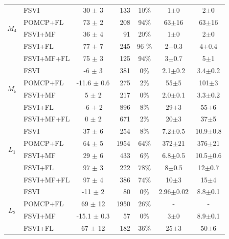 \documentclass[letterpaper]{article} %
\newcommand{\itay}[1]{}
\begin{document}
\begin{table}
{\begin{tabular}{ |c|l|c|r|c|c|c| }
    \multirow{4}{*}{$M_4$}      
    & FSVI\itay{+} & 30 $\pm$ 3 & 133 & 10\% & 1$\pm$0 & 2$\pm$0 \\
    & POMCP+FL\itay{+} & 73 $\pm$ 2 & 208 & 94\% & 63$\pm$16 & 63$\pm$16 \\
    & FSVI+MF\itay{+} & 36 $\pm$ 4 & 91 & 20\% & 1$\pm$0 & 2$\pm$0 \\
    &FSVI+FL\itay{+} & 77 $\pm$ 7 & 245 & 96 \% & 2$\pm$0.3 & 4$\pm$0.4 \\
    & FSVI+MF+FL\itay{+} & 75 $\pm$ 3 & 125 & 94\% & 3$\pm$0.7 & 5$\pm$1 \\
    \hline\hline
    \multirow{4}{*}{$M_5$}      
    & FSVI\itay{+} & -6 $\pm$ 3 & 381 & 0\% & 2.1$\pm$0.2 & 3.4$\pm$0.2 \\
    & POMCP+FL\itay{+} & -11.6 $\pm$ 0.6 & 275 & 2\% & 55$\pm$5 & 101$\pm$3 \\
    & FSVI+MF\itay{+} & 5 $\pm$ 2 & 217 & 0\% & 2.0$\pm$0.1 & 3.3$\pm$0.2 \\
    &FSVI+FL\itay{+} & -6 $\pm$ 2 & 896 & 8\% & 29$\pm$3 & 55$\pm$6 \\
    & FSVI+MF+FL\itay{+} & 0 $\pm$ 2 & 671 & 2\% & 20$\pm$3 & 37$\pm$5 \\
    \hline\hline
    \multirow{4}{*}{$L_1$}
    & FSVI\itay{+} & 37 $\pm$ 6 & 254 & 8\% &  7.2$\pm$0.5 & 10.9$\pm$0.8 \\
    & POMCP+FL\itay{+} & 64 $\pm$ 5 & 1954 & 64\% &  372$\pm$21 & 376$\pm$21 \\
    & FSVI+MF\itay{+} & 29 $\pm$ 6 & 433 & 6\% &  6.8$\pm$0.5 & 10.5$\pm$0.6 \\
    &FSVI+FL\itay{+} & 97 $\pm$ 3 & 222 & 78\% &  8$\pm$0.5 & 12$\pm$0.7 \\ 
    & FSVI+MF+FL\itay{+} & 97 $\pm$ 4 & 386 & 74\% &  10$\pm$3 & 15$\pm$4 \\
    \hline\hline
    \multirow{4}{*}{$L_2$}
    & FSVI\itay{+} & -11 $\pm$ 2 & 80 & 0\% &  2.96$\pm$0.02 & 8.8$\pm$0.1 \\
    & POMCP+FL\itay{-} & 69 $\pm$ 12 & 1950 & 26\% &  - & - \\
    & FSVI+MF\itay{+} & -15.1 $\pm$ 0.3 & 57 & 0\% &  3$\pm$0 & 8.9$\pm$0.1 \\
    &FSVI+FL\itay{+} & 67 $\pm$ 12 & 182 & 36\% &  25$\pm$3 & 50$\pm$6 \\

\end{tabular}}
\end{table}
\end{document}
